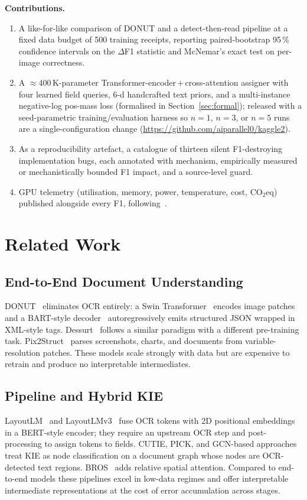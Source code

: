 \documentclass[conference]{IEEEtran}
\begin{document}
\medskip
\noindent\textbf{Contributions.}
\begin{enumerate}
\item A like-for-like comparison of DONUT and a detect-then-read
  pipeline at a fixed data budget of 500 training receipts, reporting
  paired-bootstrap 95\,\% confidence intervals on the $\Delta$F1
  statistic and McNemar's exact test on per-image correctness.
\item A $\approx$400\,K-parameter Transformer-encoder\,$+$\,cross-attention
  assigner with four learned field queries, 6-d handcrafted text
  priors, and a multi-instance negative-log pos-mass loss (formalised
  in Section~\ref{sec:formal}); released with a seed-parametric
  training/evaluation harness so $n{=}1$, $n{=}3$, or $n{=}5$ runs
  are a single-configuration change
  (\url{https://github.com/aiparallel0/kaggle2}).
\item As a reproducibility artefact, a catalogue of thirteen silent
  F1-destroying implementation bugs, each annotated with mechanism,
  empirically measured or mechanistically bounded F1 impact, and a
  source-level guard.
\item GPU telemetry (utilisation, memory, power, temperature, cost,
  CO$_2$eq) published alongside every F1, following~\cite{strubell2019energy}.
\end{enumerate}


\section{Related Work}

\subsection{End-to-End Document Understanding}
DONUT~\cite{kim2022donut} eliminates OCR entirely: a Swin
Transformer~\cite{liu2021swin} encodes image patches and a BART-style
decoder~\cite{lewis2020bart} autoregressively emits structured JSON
wrapped in XML-style tags.  Dessurt~\cite{davis2022dessurt} follows a
similar paradigm with a different pre-training task.
Pix2Struct~\cite{lee2023pix2struct} parses screenshots, charts, and
documents from variable-resolution patches.  These models scale
strongly with data but are expensive to retrain and produce no
interpretable intermediates.

\subsection{Pipeline and Hybrid KIE}
LayoutLM~\cite{xu2020layoutlm} and LayoutLMv3~\cite{huang2022layoutlmv3}
fuse OCR tokens with 2D positional embeddings in a BERT-style encoder;
they require an upstream OCR step and post-processing to assign tokens
to fields.  CUTIE, PICK, and GCN-based approaches treat KIE as node
classification on a document graph whose nodes are OCR-detected text
regions.  BROS~\cite{hong2022bros} adds relative spatial attention.
Compared to end-to-end models these pipelines excel in low-data
regimes and offer interpretable intermediate representations at the
cost of error accumulation across stages.
\end{document}
